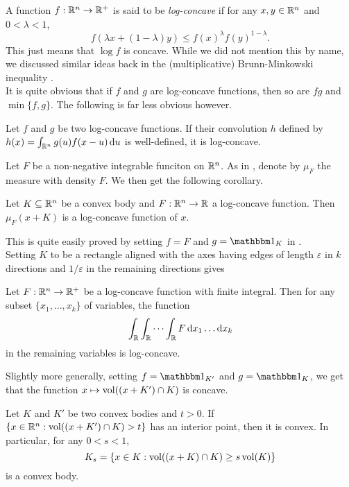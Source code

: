 A function $f:\mathbb{R}^n\to\mathbb{R}^+$ is said to be \textit{log-concave} if for any $x,y\in\mathbb{R}^n$ and $0<\lambda<1$,
\[ f(\lambda x + (1-\lambda)y) \leq f(x)^\lambda f(y)^{1-\lambda}. \]
This just means that $\log f$ is concave. While we did not mention this by name, we discussed similar ideas back in the (multiplicative) Brunn-Minkowski inequality .\\

It is quite obvious that if $f$ and $g$ are log-concave functions, then so are $fg$ and $\min\{f,g\}$. The following is far less obvious however.

\begin{lemma}
\label{convolution of log concave functions is log concave}
    Let $f$ and $g$ be two log-concave functions. If their convolution $h$ defined by $h(x)=\int_{\mathbb{R}^n}g(u)f(x-u)\operatorname{d}\!{u}$ is well-defined, it is log-concave.
\end{lemma}

Let $F$ be a non-negative integrable funciton on $\mathbb{R}^n$. As in , denote by $\mu_F$ the measure with density $F$. We then get the following corollary.

\begin{corollary}
\label{F(x+K) log concave K convex}
    Let $K\subseteq\mathbb{R}^n$ be a convex body and $F:\mathbb{R}^n\to\mathbb{R}$ a log-concave function. Then $\mu_F(x+K)$ is a log-concave function of $x$.
\end{corollary}

This is quite easily proved by setting $f=F$ and $g=\indic_K$ in .\\

Setting $K$ to be a rectangle aligned with the axes having edges of length $\varepsilon$ in $k$ directions and $1/\varepsilon$ in the remaining directions gives

\begin{corollary}
    Let $F:\mathbb{R}^n\to\mathbb{R}^+$ be a log-concave function with finite integral. Then for any subset $\{x_1,\ldots,x_k\}$ of variables, the function
    \[ \int_{\mathbb{R}} \int_{\mathbb{R}} \cdots \int_{\mathbb{R}} F \operatorname{d}\!{x}_1\ldots\operatorname{d}\!{x_k} \]
    in the remaining variables is log-concave.
\end{corollary}

Slightly more generally, setting $f=\indic_{K'}$ and $g=\indic_K$, we get that the function $x\mapsto \operatorname{vol}((x+K')\cap K)$ is concave.

\begin{corollary}
    Let $K$ and $K'$ be two convex bodies and $t>0$. If $\{x\in\mathbb{R}^n:\operatorname{vol}((x+K')\cap K)>t\}$ has an interior point, then it is convex. In particular, for any $0<s<1$,
    \[ K_s = \{x\in K : \operatorname{vol}((x+K)\cap K) \geq s\operatorname{vol}(K)\} \]
    is a convex body.
\end{corollary}

